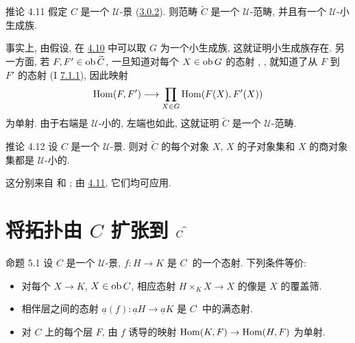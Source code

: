 \begin{enonce*}{推论 4.11}
假定 $C$ 是一个 $𝒰$-景 (\hyperref[II.def3.0.2]{3.0.2}).
则范畴 $\widetilde{C}$ 是一个 $𝒰$-范畴,
并且有一个 $𝒰$-小生成族.
\end{enonce*}

事实上, 由假设, 在 \hyperref[II.prop4.10]{4.10} 中可以取 $G$
为一个小生成族, 这就证明小生成族存在.
另一方面, 若 $F,F'\in\operatorname{ob}\widetilde{C}$,
一旦知道对每个 $X\in\operatorname{ob} G$ 的态射
,
\ie {},
就知道了从 $F$ 到 $F'$ 的态射
(I \hyperref[I.sec7.1.1]{7.1.1}), 因此映射
$$
\operatorname{Hom}(F,F')\longrightarrow \prod_{X\in G}\operatorname{Hom}(F(X),F'(X))
$$
为单射. 由于右端是 $𝒰$-小的, 左端也如此,
这就证明 $\widetilde{C}$ 是一个 $𝒰$-范畴.

\begin{enonce*}{推论 4.12}
设 $C$ 是一个 $𝒰$-景.
则对 $\widetilde{C}$ 的每个对象 $X$,
$X$ 的子对象集和 $X$ 的商对象集都是 $𝒰$-小的.
\end{enonce*}

这分别来自 
和 ;
由 \hyperref[II.cor4.11]{4.11}, 它们均可应用.




\section{将拓扑由 $C$ 扩张到 $C^{\protect\widehat{\;\hbox{}}}$}

\begin{enonce*}{命题 5.1}
设 $C$ 是一个 $𝒰$-景,
$f:H\rightarrow K$ 是 $C^{\widehat{\phantom{,}}}$ 的一个态射.
下列条件等价:
\begin{itemize}
\item[i)] 对每个 $X\rightarrow K$, $X\in \operatorname{ob} C$,
相应态射 $H\times_K X\rightarrow X$ 的像是 $X$ 的覆盖筛.

\item[ii)] 相伴层之间的态射
$\underline{a}(f):\underline{a}H\rightarrow \underline{a}K$
是\pageoriginale{} $C^{\widetilde{\phantom{,}}}$ 中的满态射.

\item[ii bis)] 对 $C$ 上的每个层 $F$,
由 $f$ 诱导的映射 $\operatorname{Hom}(K,F)\rightarrow \operatorname{Hom}(H,F)$ 为单射.
\end{itemize}
\end{enonce*}

